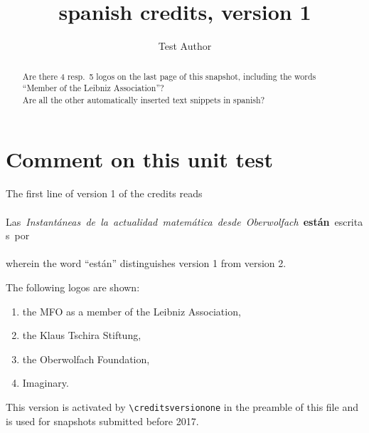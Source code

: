 \documentclass{snapshotmfo}
\author{Test Author}
\title{spanish credits, version 1}
\begin{document}

\begin{abstract}
Are there 4 resp.\ 5 logos on the last page of this snapshot, including the words ``Member of the Leibniz Association''?\\
Are all the other automatically inserted text snippets in spanish?
\end{abstract}

\section{Comment on this unit test}
The first line of version 1 of the credits reads\\
\\
\hbox{Las \emph{Instantáneas de la actualidad matemática desde Oberwolfach} \textbf{están} escritas por}\\
\\
wherein the word ``están'' distinguishes version 1 from version 2.

The following logos are shown:
\begin{enumerate}
  \item the MFO as a member of the Leibniz Association,
  \item the Klaus Tschira Stiftung,
  \item the Oberwolfach Foundation,
  \item Imaginary.
\end{enumerate}
This version is activated by \verb+\creditsversionone+ in the preamble of this file
and is used for snapshots submitted before 2017.
\end{document}
